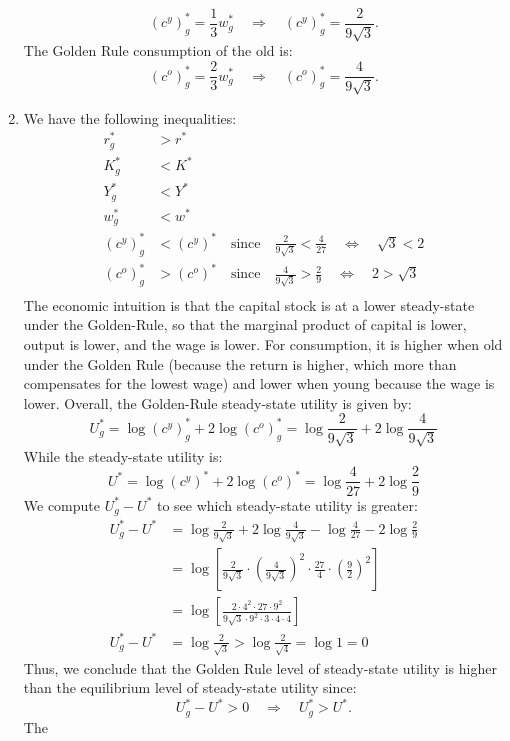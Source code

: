 \documentclass[]{book}
\theoremstyle{definition}
\theoremstyle{definition}
\theoremstyle{definition}
\theoremstyle{remark}
\begin{document}
\begin{enumerate}
  \[(c^y)^{*}_g = \frac{1}{3}w^{*}_g \quad \Rightarrow \quad \boxed{(c^y)^{*}_g = \frac{2}{9\sqrt{3}}}.\]
  The Golden Rule consumption of the old is:
  \[(c^o)^{*}_g = \frac{2}{3}w^{*}_g \quad \Rightarrow \quad \boxed{(c^o)^{*}_g = \frac{4}{9\sqrt{3}}}.\]
\item
  We have the following inequalities: \[
  \begin{aligned}
  r^{*}_g &> r^{*}\\
  K^{*}_g &< K^{*}\\
  Y^{*}_g &< Y^{*}\\
  w^{*}_g &< w^{*}\\
  (c^y)^{*}_g &< (c^y)^{*} \quad \text{since} \quad \frac{2}{9\sqrt{3}}<\frac{4}{27} \quad \Leftrightarrow \quad \sqrt{3} <2 \\
  (c^o)^{*}_g &> (c^o)^{*} \quad \text{since} \quad \frac{4}{9\sqrt{3}}>\frac{2}{9} \quad \Leftrightarrow \quad 2 >\sqrt{3} \\
  \end{aligned}
  \] The economic intuition is that the capital stock is at a lower
  steady-state under the Golden-Rule, so that the marginal product of
  capital is lower, output is lower, and the wage is lower. For
  consumption, it is higher when old under the Golden Rule (because the
  return is higher, which more than compensates for the lowest wage) and
  lower when young because the wage is lower. Overall, the Golden-Rule
  steady-state utility is given by:
  \[U^*_g = \log(c^y)^{*}_g+2\log(c^o)^{*}_g = \log\frac{2}{9\sqrt{3}}+2\log \frac{4}{9\sqrt{3}}\]
  While the steady-state utility is:
  \[U^* = \log(c^y)^{*}+2\log(c^o)^{*} = \log\frac{4}{27}+2\log \frac{2}{9}\]
  We compute \(U^{*}_g-U^{*}\) to see which steady-state utility is
  greater: \[
  \begin{aligned}
  U^{*}_g-U^{*} &= \log\frac{2}{9\sqrt{3}}+2\log \frac{4}{9\sqrt{3}} - \log\frac{4}{27}-2\log \frac{2}{9}\\
  &= \log \left[\frac{2}{9\sqrt{3}} \cdot \left(\frac{4}{9\sqrt{3}}\right)^2 \cdot\frac{27}{4} \cdot \left(\frac{9}{2}\right)^2\right]\\
  &=\log \left[\frac{2 \cdot 4^2 \cdot 27 \cdot 9^2}{9\sqrt{3} \cdot 9^2 \cdot 3\cdot 4 \cdot 4}\right]\\
  U^{*}_g-U^{*}&=\log \frac{2}{\sqrt3} > \log \frac{2}{\sqrt4}=\log1 =0
  \end{aligned}
  \] Thus, we conclude that the Golden Rule level of steady-state
  utility is higher than the equilibrium level of steady-state utility
  since:
  \[U^{*}_g-U^{*}>0\quad \Rightarrow \quad \boxed{U^{*}_g>U^{*}}.\] The

\end{enumerate}
\end{document}
